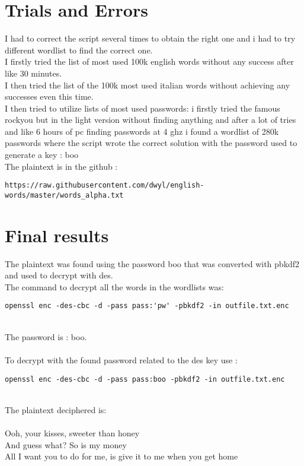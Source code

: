 \documentclass{article}
\begin{document}
\section{Trials and Errors}
I had to correct the script several times to obtain the right one and i had to try different wordlist to find the correct one.\\
I firstly tried the list of most used 100k english words without any success after like 30 minutes.\\
I then tried the list of the 100k most used italian words without achieving any successes even this time.\\
I then tried to utilize lists of most used passwords: i firstly tried the famous rockyou but in the light version without finding anything and after a lot of tries and like 6 hours of pc finding passwords at 4 ghz i found a wordlist of 280k passwords where the script wrote the correct solution with the password used to generate a key : boo\\
The plaintext is in the github :\\
\begin{verbatim}
https://raw.githubusercontent.com/dwyl/english-words/master/words_alpha.txt
\end{verbatim}

\section{Final results}
The plaintext was found using the password boo that was converted with pbkdf2 and used to decrypt with des.\\
The command to decrypt all the words in the wordlists was:\\
\begin{verbatim}
openssl enc -des-cbc -d -pass pass:'pw' -pbkdf2 -in outfile.txt.enc
\end{verbatim}\\
The password is : boo.\\\\
To decrypt with the found password related to the des key use :
\begin{verbatim}
openssl enc -des-cbc -d -pass pass:boo -pbkdf2 -in outfile.txt.enc
\end{verbatim}\\
The plaintext deciphered is: \\\\
Ooh, your kisses, sweeter than honey\\
And guess what? So is my money\\
All I want you to do for me, is give it to me when you get home\\
\end{document}
